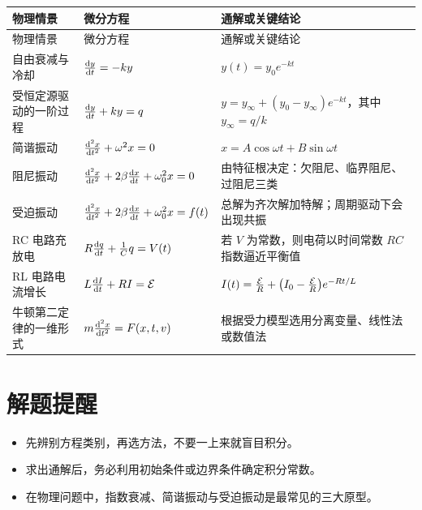 \begin{longtable}{p{}p{}p{}}
\toprule
物理情景 & 微分方程 & 通解或关键结论 \\
\midrule
\endfirsthead

\toprule
物理情景 & 微分方程 & 通解或关键结论 \\
\midrule
\endhead

\bottomrule
\endfoot

自由衰减与冷却 & $\dv{y}{t}=-ky$ & $y(t)=y_0 e^{-kt}$ \\

受恒定源驱动的一阶过程 & $\dv{y}{t}+ky=q$ & $y=y_{\infty}+(y_0-y_{\infty})e^{-kt}$，其中 $y_{\infty}=q/k$ \\

简谐振动 & $\dv[2]{x}{t}+\omega^2 x=0$ & $x=A\cos\omega t+B\sin\omega t$ \\

阻尼振动 & $\dv[2]{x}{t}+2\beta\dv{x}{t}+\omega_0^2 x=0$ & 由特征根决定：欠阻尼、临界阻尼、过阻尼三类 \\

受迫振动 & $\dv[2]{x}{t}+2\beta\dv{x}{t}+\omega_0^2 x=f(t)$ & 总解为齐次解加特解；周期驱动下会出现共振 \\

RC 电路充放电 & $R\dv{q}{t}+\frac{1}{C}q=V(t)$ & 若 $V$ 为常数，则电荷以时间常数 $RC$ 指数逼近平衡值 \\

RL 电路电流增长 & $L\dv{I}{t}+RI=\mathcal{E}$ & $I(t)=\frac{\mathcal{E}}{R}+\qty(I_0-\frac{\mathcal{E}}{R})e^{-Rt/L}$ \\

牛顿第二定律的一维形式 & $m\dv[2]{x}{t}=F(x,t,v)$ & 根据受力模型选用分离变量、线性法或数值法 \\

\end{longtable}

\section{解题提醒}

\begin{itemize}
  \item 先辨别方程类别，再选方法，不要一上来就盲目积分。
  \item 求出通解后，务必利用初始条件或边界条件确定积分常数。
  \item 在物理问题中，指数衰减、简谐振动与受迫振动是最常见的三大原型。
\end{itemize}

